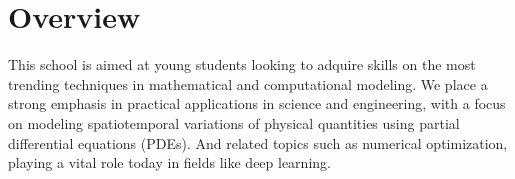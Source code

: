 \documentclass[letterpaper]{inzane_syllabus} %
\begin{document}

\makeprofile %

\section{Overview}

This school is aimed at young students looking to adquire skills on the most trending techniques in mathematical and computational modeling. We place a strong emphasis in practical applications in science and engineering, with a focus on modeling spatiotemporal variations of physical quantities using partial differential equations (PDEs). And related topics such as numerical optimization, playing a vital role today in fields like deep learning.




\end{document}
